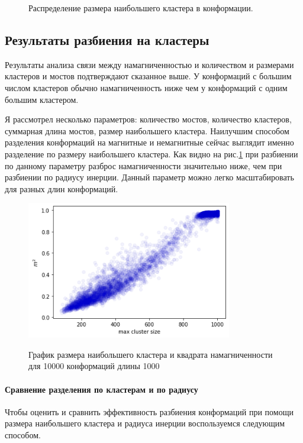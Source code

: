 \begin{figure}[H]
\begin{subfigure}[t]{0.3\textwidth}
	\end{subfigure}
	\caption{Распределение размера наибольшего кластера в конформации.}
\end{figure}


\subsection{Результаты разбиения на кластеры}
Результаты анализа связи между намагниченностью и количеством и размерами кластеров и мостов подтверждают сказанное выше. У конформаций с большим числом кластеров обычно намагниченность ниже чем у конформаций с одним большим кластером. 

Я рассмотрел несколько параметров: количество мостов, количество кластеров, суммарная длина мостов, размер наибольшего кластера. Наилучшим способом разделения конформаций на магнитные и немагнитные сейчас выглядит именно разделение по размеру наибольшего кластера. Как видно на рис.\ref{fig:mag_from_max_cluster} при разбиении по данному параметру разброс намагниченности значительно ниже, чем при разбиении по радиусу инерции. Данный параметр можно легко масштабировать для разных длин конформаций.

\begin{figure}[h]
	\centering
	\caption{График размера наибольшего кластера и квадрата намагниченности для 10000 конформаций длины 1000}
	\includegraphics[width=0.8\textwidth]{../images/mag_from_cluster_size.png} 
	\label{fig:mag_from_max_cluster}
\end{figure}

\paragraph{Сравнение разделения по кластерам и по радиусу}
Чтобы оценить и сравнить эффективность разбиения конформаций при помощи размера наибольшего кластера и радиуса инерции воспользуемся следующим способом.

